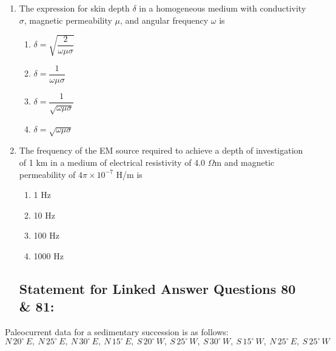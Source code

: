 \documentclass[journal,12pt,onecolumn]{IEEEtran}
\theoremstyle{remark}
\begin{document}
\begin{enumerate}[resume]

\item The expression for skin depth $\delta$ in a homogeneous medium with conductivity $\sigma$, magnetic permeability $\mu$, and angular frequency $\omega$ is

\begin{multicols}{4}
\begin{enumerate}
\item $\delta = \sqrt{\dfrac{2}{\omega \mu \sigma}}$  
\item $\delta = \dfrac{1}{\omega \mu \sigma}$  
\item $\delta = \dfrac{1}{\sqrt{\omega \mu \sigma}}$  
\item $\delta = \sqrt{\omega \mu \sigma}$  
\end{enumerate}
\end{multicols}
\vspace{0.5cm}

\item The frequency of the EM source required to achieve a depth of investigation of 1 km in a medium of electrical resistivity of 4.0 $\Omega$m and magnetic permeability of $4\pi \times 10^{-7}$ H/m is

\begin{multicols}{4}
\begin{enumerate}
\item 1 Hz  
\item 10 Hz  
\item 100 Hz  
\item 1000 Hz  
\end{enumerate}
\end{multicols}
\vspace{0.5cm}

\subsection*{Statement for Linked Answer Questions 80 \& 81:}
\end{enumerate}
\vspace{0.5cm}

Paleocurrent data for a sedimentary succession is as follows:
\vspace{0.5cm}
$$N\,20^\circ\,E,\ N\,25^\circ\,E,\ N\,30^\circ\,E,\ N\,15^\circ\,E,\ S\,20^\circ\,W,\ S\,25^\circ\,W,\ S\,30^\circ\,W,\ S\,15^\circ\,W,\ N\,25^\circ\,E,\ S\,25^\circ\,W$$
\end{document}
